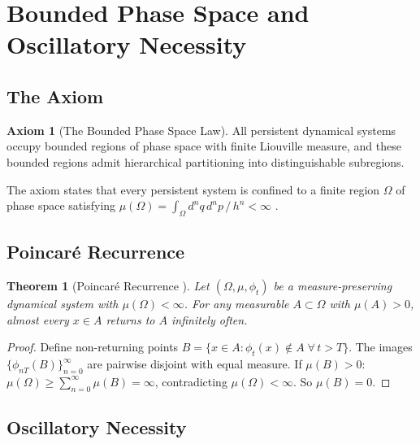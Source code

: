 \documentclass[11pt,twocolumn,a4paper]{article}
\newtheorem{theorem}{Theorem}[section]
\theoremstyle{definition}
\newtheorem{axiom}{Axiom}
\theoremstyle{remark}
\begin{document}
\section{Bounded Phase Space and Oscillatory Necessity}
\label{sec:foundations}

\subsection{The Axiom}

\begin{axiom}[The Bounded Phase Space Law]
\label{ax:bpsl}
All persistent dynamical systems occupy bounded regions of phase space with finite Liouville measure, and these bounded regions admit hierarchical partitioning into distinguishable subregions.
\end{axiom}

The axiom states that every persistent system is confined to a finite region $\Omega$ of phase space satisfying $\mu(\Omega) = \int_\Omega d^nq\,d^np\,/\,h^n < \infty$ \citep{planck1901}.

\subsection{Poincar\'e Recurrence}

\begin{theorem}[Poincar\'e Recurrence {\citep{poincare1890}}]
\label{thm:poincare}
Let $(\Omega, \mu, \phi_t)$ be a measure-preserving dynamical system with $\mu(\Omega) < \infty$. For any measurable $A \subset \Omega$ with $\mu(A) > 0$, almost every $x \in A$ returns to $A$ infinitely often.
\end{theorem}

\begin{proof}
Define non-returning points $B = \{x \in A : \phi_t(x) \notin A\;\forall\,t > T\}$. The images $\{\phi_{nT}(B)\}_{n=0}^\infty$ are pairwise disjoint with equal measure. If $\mu(B) > 0$: $\mu(\Omega) \geq \sum_{n=0}^\infty \mu(B) = \infty$, contradicting $\mu(\Omega) < \infty$. So $\mu(B) = 0$.
\end{proof}

\subsection{Oscillatory Necessity}
\end{document}
